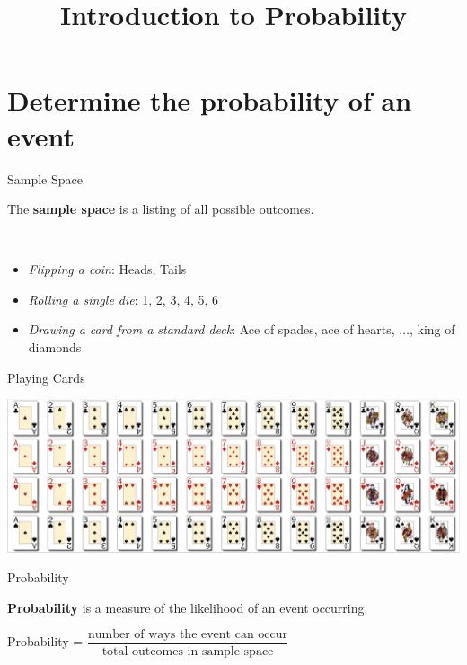 \documentclass[t]{beamer}
\title{Introduction to Probability}
\author{}
\date{}
\begin{document}
\begin{frame} 
\maketitle
\end{frame}

\section{Determine the probability of an event}

\begin{frame}{Sample Space}
\begin{tcolorbox}[colframe=green!20!black, colback = green!30!white,title=\textbf{Sample Space}]
The \textbf{sample space} is a listing of all possible outcomes.
\end{tcolorbox}
\vspace{6pt} \pause
{} \\
\begin{itemize}
	\item<+->{\emph{Flipping a coin}: Heads, Tails}
	\item<+->{\emph{Rolling a single die}: 1, 2, 3, 4, 5, 6}
	\item<+->{\emph{Drawing a card from a standard deck}: Ace of spades, ace of hearts, $\dots$, king of diamonds}
\end{itemize}
\end{frame}

\begin{frame}{Playing Cards}
\begin{center}
\includegraphics[scale=0.23]{../Images/Playing_Cards.png}
\end{center}
\end{frame}

\begin{frame}{Probability}
\begin{tcolorbox}[colframe=green!20!black, colback = green!30!white,title=\textbf{Probability}]
\textbf{Probability} is a measure of the likelihood of an event occurring.
\end{tcolorbox}
\vspace{6pt} \pause
\begin{center}
Probability = $\dfrac{\text{number of ways the event can occur}}{\text{total outcomes in sample space}}$
\end{center}
\end{frame}
\end{document}
